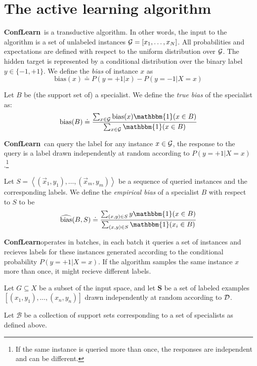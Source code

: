 \documentclass{article}
\newcommand{\x}{\vec{x}}
\newcommand{\ones}{\mathbbm{1}}
\newcommand{\cB}{\mathcal{B}}
\newcommand{\bias}{\text{bias}}
\newcommand{\ebias}{\widehat{\text{bias}}}
\newcommand{\samp}{S}
\begin{document}
\section{The active learning algorithm}

\newcommand{\ActiveLearn}{{\bf ConfLearn}}
\newcommand{\universe}{{\cal G}}

\ActiveLearn\  is a transductive algorithm. In other words, the input
to the algorithm is a set of unlabeled instances $\universe =
[x_1,\ldots,x_N]$. All probabilities and expectations are defined with
respect to the uniform distribution over $\universe$. The hidden
target is represented by a conditional distribution over the binary label
$y \in \{-1,+1\}$. We define the {\em bias} of instance $x$ as
\[
\bias(x) \doteq P(y=+1|x) - P(y=-1|X=x)
\]

Let $B$ be (the support set of) a specialist. We define the {\em true
  bias} of the specialist as:
\[
\bias(B) \doteq \frac{\sum_{x \in \universe} \bias(x) \ones(x \in
  B)}{\sum_{x \in \universe} \ones(x \in B)}
\]

\ActiveLearn\ can query the label for any instance $x \in \universe$, the
response to the query is a label drawn independently at random
according to $P(y=+1 | X=x)$.\footnote{If the same instance is queried
  more than once, the responses are independent and can be different.}

Let $\samp= \left\langle (\x_1,y_1),\ldots,(\x_m,y_m) \right\rangle$ be a sequence
of queried instances and the corresponding labels. We define the {\em
  empirical bias} of a specialist $B$ with respect to $\samp$ to be 
\[
\ebias(B,\samp) \doteq
\frac{\sum_{(x,y) \in \samp} y \ones(x \in B)}{ \sum_{(x,y) \in \samp} \ones(x_i \in B)}
\]

\ActiveLearn operates in batches, in each batch it queries a set of
instances and recieves labels for these instances generated according
to the conditional probability $P(y=+1 | X=x)$. If the algorithm
samples the same instance $x$ more than once, it might recieve
different labels.

\newcommand{\set}{G}
\newcommand{\sample}[1]{{\mathbf #1}}
\newcommand{\constr}[3]{#1 \left(#2,\sample{#3}\right)}
  
Let $\set \subseteq X$ be a subset of the input space, and let
$\sample{S}$ be a set of labeled examples
$[(x_1,y_1),\ldots,(x_n,y_n)]$ drawn independently at random according
to ${\cal D}$.

Let $\cB$ be a collection of support sets corresponding to a set of
specialists as defined above.
\end{document}

